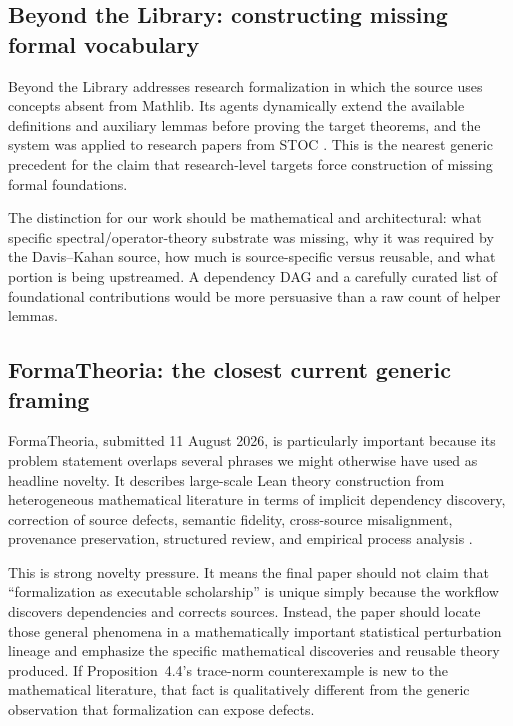 \documentclass[11pt]{article}
\begin{document}
\subsection{Beyond the Library: constructing missing formal vocabulary}

Beyond the Library addresses research formalization in which the source uses
concepts absent from Mathlib.  Its agents dynamically extend the available
definitions and auxiliary lemmas before proving the target theorems, and the
system was applied to research papers from STOC \citep{moakhar2026beyondlibrary}.
This is the nearest generic precedent for the claim that research-level targets
force construction of missing formal foundations.

The distinction for our work should be mathematical and architectural: what
specific spectral/operator-theory substrate was missing, why it was required by
the Davis--Kahan source, how much is source-specific versus reusable, and what
portion is being upstreamed.  A dependency DAG and a carefully curated list of
foundational contributions would be more persuasive than a raw count of helper
lemmas.

\subsection{FormaTheoria: the closest current generic framing}

FormaTheoria, submitted 11 August 2026, is particularly important because its
problem statement overlaps several phrases we might otherwise have used as
headline novelty.  It describes large-scale Lean theory construction from
heterogeneous mathematical literature in terms of implicit dependency
discovery, correction of source defects, semantic fidelity, cross-source
misalignment, provenance preservation, structured review, and empirical process
analysis \citep{nie2026formatheoria}.

This is strong novelty pressure.  It means the final paper should not claim that
``formalization as executable scholarship'' is unique simply because the
workflow discovers dependencies and corrects sources.  Instead, the paper should
locate those general phenomena in a mathematically important statistical
perturbation lineage and emphasize the specific mathematical discoveries and
reusable theory produced.  If Proposition~4.4's trace-norm counterexample is new
to the mathematical literature, that fact is qualitatively different from the
generic observation that formalization can expose defects.
\end{document}

